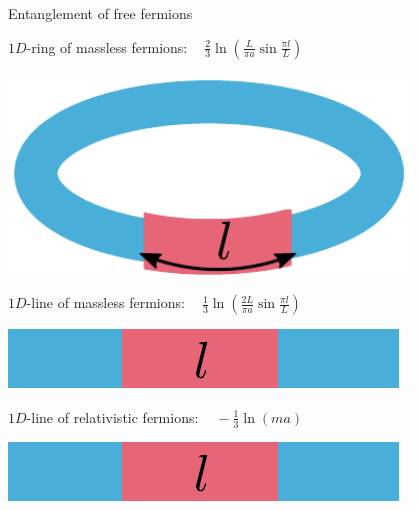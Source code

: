 \documentclass[11pt,aspectratio=169]{beamer}
\begin{document}
\begin{frame}{Entanglement of free fermions}
	\begin{minipage}{0.6\textwidth}
		\vspace{15pt}
	\(1D\)-ring of massless fermions: \(~ ~ ~ ~ \frac{2}{3} \ln \left( \frac{L}{\pi a} \sin \frac{\pi l}{L}\right) \)
		\vspace{15pt}
	\end{minipage}
	\begin{minipage}{0.39\textwidth}
		\centering
		\includegraphics[width=0.8\textwidth]{figures/ring.pdf}
	\end{minipage}

	\begin{minipage}{0.6\textwidth}
		\vspace{15pt}
	\(1D\)-line of massless fermions: \(~ ~ ~ ~ \frac{1}{3} \ln \left( \frac{2L}{\pi a} \sin \frac{\pi l}{L}\right) \)
		\vspace{15pt}
	\end{minipage}
	\begin{minipage}{0.39\textwidth}
		\centering
		\includegraphics[width=\textwidth]{figures/open.pdf}
	\end{minipage}

	\begin{minipage}{0.6\textwidth}
		\vspace{15pt}
	\(1D\)-line of relativistic fermions: \(~ ~ ~ ~ -\frac{1}{3} \ln \left( m a\right) \)
		\vspace{15pt}
	\end{minipage}
	\begin{minipage}{0.39\textwidth}
		\centering
		\includegraphics[width=\textwidth]{figures/open.pdf}
	\end{minipage}


\end{frame}
\end{document}
